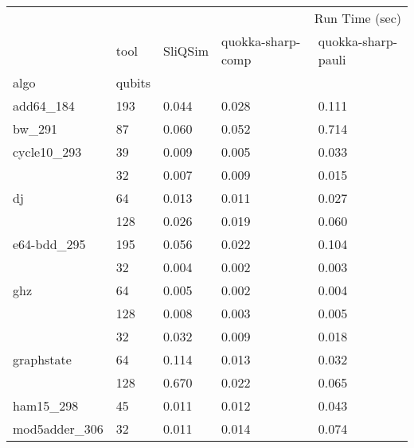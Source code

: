 \begin{tabular}{lllll}
\toprule
 &  & \multicolumn{3}{r}{Run Time (sec)} \\
 & tool & SliQSim & quokka-sharp-comp & quokka-sharp-pauli \\
algo & qubits &  &  &  \\
\midrule
add64_184 & 193 & 0.044 & 0.028 & 0.111 \\
\cline{1-5}
bw_291 & 87 & 0.060 & 0.052 & 0.714 \\
\cline{1-5}
cycle10_293 & 39 & 0.009 & 0.005 & 0.033 \\
\cline{1-5}
\multirow[t]{3}{*}{dj} & 32 & 0.007 & 0.009 & 0.015 \\
 & 64 & 0.013 & 0.011 & 0.027 \\
 & 128 & 0.026 & 0.019 & 0.060 \\
\cline{1-5}
e64-bdd_295 & 195 & 0.056 & 0.022 & 0.104 \\
\cline{1-5}
\multirow[t]{3}{*}{ghz} & 32 & 0.004 & 0.002 & 0.003 \\
 & 64 & 0.005 & 0.002 & 0.004 \\
 & 128 & 0.008 & 0.003 & 0.005 \\
\cline{1-5}
\multirow[t]{3}{*}{graphstate} & 32 & 0.032 & 0.009 & 0.018 \\
 & 64 & 0.114 & 0.013 & 0.032 \\
 & 128 & 0.670 & 0.022 & 0.065 \\
\cline{1-5}
ham15_298 & 45 & 0.011 & 0.012 & 0.043 \\
\cline{1-5}
mod5adder_306 & 32 & 0.011 & 0.014 & 0.074 \\
\cline{1-5}
\bottomrule
\end{tabular}
